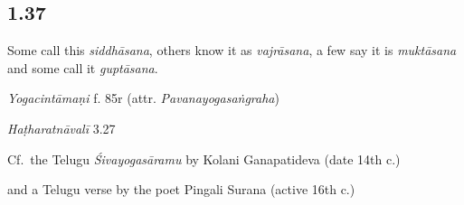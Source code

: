 \begin{ekdosis}
\subsection*{1.37}
\begin{translation}[hp01_037]
Some call this \emph{siddhāsana}, others know it as \emph{vajrāsana}, a few say it is \emph{muktāsana} and some call it \emph{guptāsana}.
\end{translation}


\begin{testimonia}[hp01_037]
\emph{Yogacintāmaṇi} f. 85r (attr. \emph{Pavanayogasaṅgraha})

\begin{versinnote}
\end{versinnote}

\emph{Haṭharatnāvalī} 3.27

\begin{versinnote}
\end{versinnote}

Cf.~the Telugu \emph{Śivayogasāramu} by Kolani Ganapatideva (date 14th c.)

\begin{versinnote}
\end{versinnote}

and a Telugu verse by the poet Pingali Surana (active 16th c.)

\begin{versinnote}
\end{versinnote}


\end{testimonia}
\end{ekdosis}
